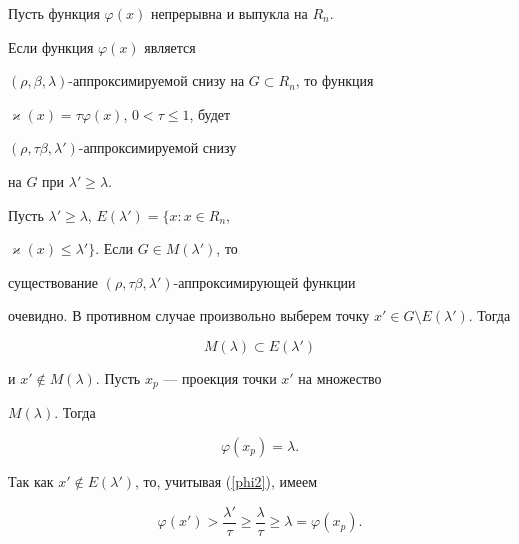 \begin{lem}\label{lem2}


Пусть функция $\varphi(x)$ непрерывна и выпукла на $R_n$. 


Если функция $\varphi(x)$ является


$(\rho,\beta,\lambda)$-аппроксимируемой снизу на $G\subset R_n$, то функция 


$\varkappa(x)=\tau\varphi(x)$, $0<\tau\leq 1$, будет


$(\rho,\tau\beta,\lambda')$-аппроксимируемой снизу


на $G$ при $\lambda'\geq\lambda$.


\end{lem}





\begin{pf}


Пусть $\lambda'\geq\lambda$, $E(\lambda')=\{x:x\in R_n$,


$\varkappa(x)\leq\lambda'\}$. Если $G\in M(\lambda')$, то


существование $(\rho,\tau\beta,\lambda')$-аппроксимирующей функции


очевидно. В противном случае произвольно выберем точку $x'\in


G\setminus E(\lambda')$. Тогда


\begin{equation}\label{M1}


M(\lambda)\subset E(\lambda')


\end{equation}


и $x'\notin M(\lambda)$. Пусть $x_p$ --- проекция точки $x'$ на множество


$M(\lambda)$. Тогда


\begin{equation}\label{phi2}


\varphi(x_p)=\lambda.


\end{equation}


Так как $x'\notin E(\lambda')$, то, учитывая (\ref{phi2}), имеем


\begin{equation}\label{phi3}


\varphi(x')>\frac{\lambda'}{\tau}\geq


\frac{\lambda}{\tau}\geq\lambda=\varphi(x_p).


\end{equation}



\end{pf}
